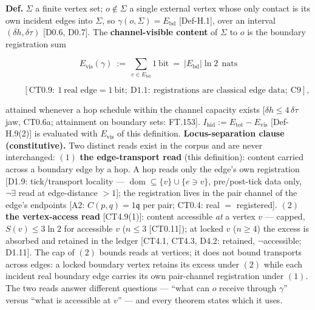 \begin{definition}\label{tag:Def-H-35}
\textbf{Def.} $\Sigma$ a finite vertex set; $o\notin\Sigma$ a single external vertex whose only contact is its own incident edges into $\Sigma$, so $\gamma(o,\Sigma)=E_{\mathrm{bd}}$ [Def-H.1], over an interval $(\delta h,\delta\tau)$ [D0.6, D0.7]. The \textbf{channel-visible content} of $\Sigma$ to $o$ is the boundary registration sum

\[
E_{\mathrm{vis}}(\gamma)\ :=\ \sum_{e\in E_{\mathrm{bd}}}1\ \text{bit}\ =\ |E_{\mathrm{bd}}|\ln2\ \ \text{nats}
\]

\[
\qquad [\mathrm{CT0.9}:\ 1\ \text{real edge}=1\ \text{bit};\ \mathrm{D1.1}:\ \text{registrations are classical edge data};\ \mathrm{C9}],
\]

attained whenever a hop schedule within the channel capacity exists [$\delta h\le4\,\delta\tau$ jaw, CT0.6a; attainment on boundary sets: FT.153]. $I_{\mathrm{hid}}:=E_{\mathrm{tot}}-E_{\mathrm{vis}}$ [Def-H.9(2)] is evaluated with $E_{\mathrm{vis}}$ of this definition. \textbf{Locus-separation clause (constitutive).} Two distinct reads exist in the corpus and are never interchanged: $(1)$ \textbf{the edge-transport read} (this definition): content carried across a boundary edge by a hop. A hop reads only the edge's own registration [D1.9: tick/transport locality — $\operatorname{dom}\subseteq\{v\}\cup\{e\ni v\}$, pre/post-tick data only, $\neg\exists$ read at edge-distance $>1$]; the registration lives in the pair channel of the edge's endpoints [A2: $C(p,q)=1\mathfrak q$ per pair; CT0.4: real $=$ registered]. $(2)$ \textbf{the vertex-access read} [CT4.9(1)]: content accessible \textit{at} a vertex $v$ — capped, $S(v)\le3\ln2$ for accessible $v$ ($n\le3$ [CT0.11]); at locked $v$ ($n\ge4$) the excess is absorbed and retained in the ledger [CT4.1, CT4.3, D4.2: retained, $\neg$accessible; D1.11]. The cap of $(2)$ bounds reads at vertices; it does not bound transports across edges: a locked boundary vertex retains its excess under $(2)$ while each incident real boundary edge carries its own pair-channel registration under $(1)$. The two reads answer different questions — “what can $o$ receive through $\gamma$” versus “what is accessible at $v$” — and every theorem states which it uses.

\end{definition}

